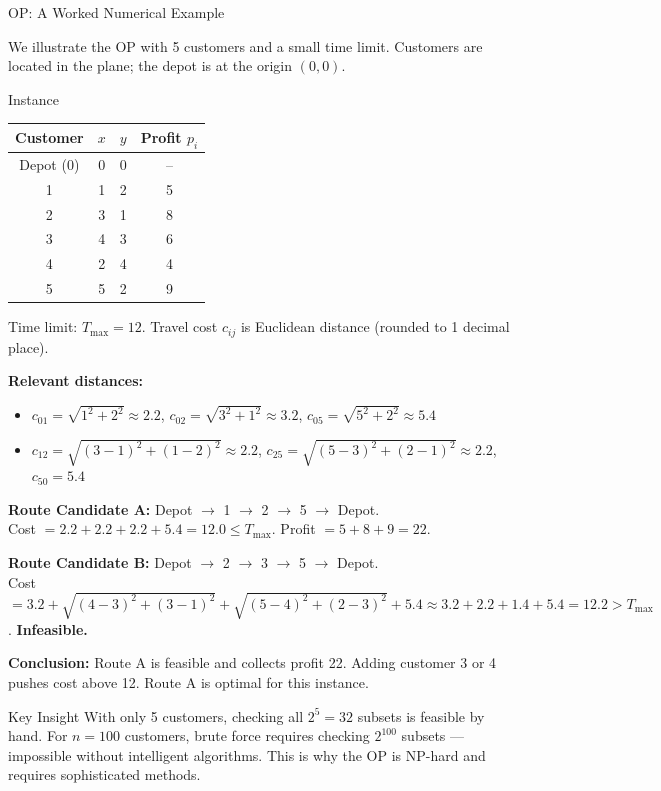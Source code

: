 \documentclass[aspectratio=169,10pt]{beamer}
\begin{document}
\begin{frame}[allowframebreaks]{OP: A Worked Numerical Example}

  We illustrate the OP with 5 customers and a small time limit.
  Customers are located in the plane; the depot is at the origin $(0,0)$.

  \medskip
  \begin{exampleblock}{Instance}
    \begin{center}
    \begin{tabular}{cccc}
      \toprule
      Customer & $x$ & $y$ & Profit $p_i$ \\
      \midrule
      Depot (0) & 0 & 0 & -- \\
      1 & 1 & 2 & 5 \\
      2 & 3 & 1 & 8 \\
      3 & 4 & 3 & 6 \\
      4 & 2 & 4 & 4 \\
      5 & 5 & 2 & 9 \\
      \bottomrule
    \end{tabular}
    \end{center}
    Time limit: $T_{\max} = 12$.
    Travel cost $c_{ij}$ is Euclidean distance (rounded to 1 decimal place).
  \end{exampleblock}

  \medskip
  \textbf{Relevant distances:}
  \begin{itemize}
    \item $c_{01} = \sqrt{1^2+2^2} \approx 2.2$,\quad
          $c_{02} = \sqrt{3^2+1^2} \approx 3.2$,\quad
          $c_{05} = \sqrt{5^2+2^2} \approx 5.4$
    \item $c_{12} = \sqrt{(3-1)^2+(1-2)^2} \approx 2.2$,\quad
          $c_{25} = \sqrt{(5-3)^2+(2-1)^2} \approx 2.2$,\quad
          $c_{50} = 5.4$
  \end{itemize}

  \medskip
  \textbf{Route Candidate A:} Depot $\to$ 1 $\to$ 2 $\to$ 5 $\to$ Depot.\\
  Cost $= 2.2 + 2.2 + 2.2 + 5.4 = 12.0 \le T_{\max}$. Profit $= 5+8+9 = 22$.

  \medskip
  \textbf{Route Candidate B:} Depot $\to$ 2 $\to$ 3 $\to$ 5 $\to$ Depot.\\
  Cost $= 3.2 + \sqrt{(4-3)^2+(3-1)^2} + \sqrt{(5-4)^2+(2-3)^2} + 5.4
        \approx 3.2 + 2.2 + 1.4 + 5.4 = 12.2 > T_{\max}$. \textbf{Infeasible.}

  \medskip
  \textbf{Conclusion:} Route A is feasible and collects profit 22.
  Adding customer 3 or 4 pushes cost above 12.
  Route A is optimal for this instance.

  \begin{alertblock}{Key Insight}
    With only 5 customers, checking all $2^5=32$ subsets is feasible
    by hand. For $n=100$ customers, brute force requires checking $2^{100}$
    subsets --- impossible without intelligent algorithms.
    This is why the OP is NP-hard and requires sophisticated methods.
  \end{alertblock}

\end{frame}
\end{document}
